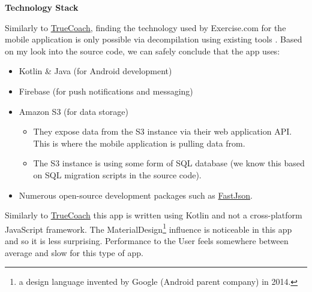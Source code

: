 \textbf{Technology Stack}
\label{research-breakdown:pjf-stack}
\par
Similarly to \hyperref[research-breakdown:tc-stack]{TrueCoach}, finding the technology used by Exercise.com for the mobile application is only possible
via decompilation using existing tools \cite{apk-decompiler}.
Based on my look into the source code, we can safely conclude that the app uses:
\begin{itemize}
	\item Kotlin \& Java (for Android development)
	\item Firebase (for push notifications and messaging)
	\pagebreak
	\item Amazon S3 (for data storage)
	\begin{itemize}
		\item They expose data from the S3 instance via their web application API.
		This is where the mobile application is pulling data from.
		\item The S3 instance  is using some form of SQL database (we know this based on SQL migration scripts in the source code).
	\end{itemize}
	\item Numerous open-source development packages such as \href{https://github.com/alibaba/fastjson}{FastJson}. 
\end{itemize}
Similarly to \hyperref[research-breakdown:tc-stack]{TrueCoach}
this app is written using Kotlin and not a cross-platform JavaScript framework.
The MaterialDesign\footnote{a design language invented by Google (Android parent company) in 2014.}
influence is noticeable in this app and so it is less surprising. Performance to the User
feels somewhere between average and slow for this type of app.

